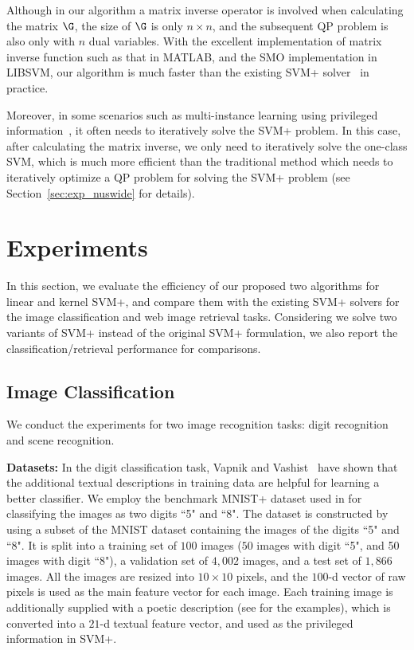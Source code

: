 Although in our algorithm a matrix inverse operator is involved when calculating the matrix $\G$, the size of $\G$ is only $n\times n$, and the subsequent QP problem is also only with $n$ dual variables. With the excellent implementation of matrix inverse function such as that in MATLAB, and the SMO implementation in LIBSVM, our algorithm is much faster than the existing SVM+ solver~\citep{Pechyony2010} in practice.

Moreover, in some scenarios such as multi-instance learning using privileged information~\citep{NiuIJCV2015}, it often needs to iteratively solve the SVM+ problem. In this case, after calculating the matrix inverse, we only need to iteratively solve the one-class SVM, which is much more efficient than the traditional method which needs to iteratively optimize a QP problem for solving the SVM+ problem (see Section~\ref{sec:exp_nuswide} for details).

\section{Experiments}
In this section, we evaluate the efficiency of our proposed two algorithms for linear and kernel SVM+, and compare them with the existing SVM+ solvers for the image classification and web image retrieval tasks. Considering we solve two variants of SVM+ instead of the original SVM+ formulation, we also report the classification/retrieval performance for comparisons.

\subsection{Image Classification}
We conduct the experiments for two image recognition tasks: digit
recognition and scene recognition.

\noindent\textbf{Datasets:}
In the digit classification task, Vapnik and
Vashist~\citep{SVMplus_vapnik} have shown that the additional textual
descriptions in training data are helpful for learning a better
classifier.  We employ the benchmark MNIST+ dataset used in
\citep{SVMplus_vapnik,Pechyony2010} for classifying the images as two
digits ``5" and ``8". The dataset is constructed by using a subset of
the MNIST dataset containing the images of the digits ``5" and
``8". It is split into a training set of $100$ images ($50$ images
with digit ``5", and 50 images with digit ``8"), a validation set of
$4,002$ images, and a test set of $1,866$ images. All the images are
resized into $10\times 10$ pixels, and the $100$-d vector of raw
pixels is used as the main feature vector for each image. Each
training image is additionally supplied with a poetic description (see
\citep{SVMplus_vapnik} for the examples), which is converted into a
$21$-d textual feature vector, and used as the privileged information
in SVM+.

